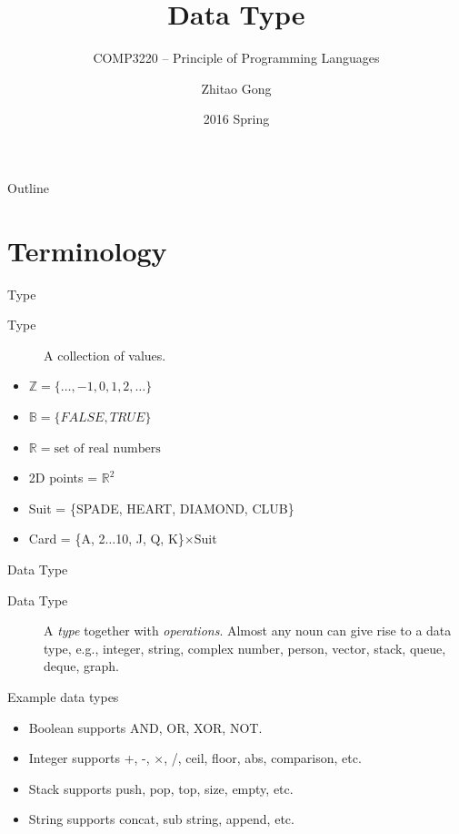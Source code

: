 \documentclass[presentation]{beamer}
\author{Zhitao Gong}
\date{2016 Spring}
\title{Data Type}
\subtitle{COMP3220 -- Principle of Programming Languages}
\begin{document}
\maketitle
\begin{frame}{Outline}
\setcounter{tocdepth}{2}
\tableofcontents
\end{frame}


\section{Terminology}
\label{sec:orgheadline4}

\begin{frame}[label={sec:orgheadline1}]{Type}
\begin{description}
\item[{Type}] A collection of values.
\end{description}


\begin{itemize}
\item \(\mathbb{Z} = \{\dots, -1, 0, 1, 2, \dots\}\)
\item \(\mathbb{B} = \{FALSE, TRUE\}\)
\item \(\mathbb{R} = \text{set of real numbers}\)
\item 2D points = \(\mathbb{R}^2\)
\item Suit = \{SPADE, HEART, DIAMOND, CLUB\}
\item Card = \{A, 2\(\dots\)10, J, Q, K\}\(\times\)Suit
\end{itemize}
\end{frame}

\begin{frame}[label={sec:orgheadline2}]{Data Type}
\begin{description}
\item[{Data Type}] A \emph{type} together with \emph{operations}.  Almost any
noun can give rise to a data type, e.g., integer, string,
complex number, person, vector, stack, queue, deque, graph.
\end{description}


Example data types

\begin{itemize}
\item Boolean supports AND, OR, XOR, NOT.
\item Integer supports +, -, \(\times\), /, ceil, floor, abs,
comparison, etc.
\item Stack supports push, pop, top, size, empty, etc.
\item String supports concat, sub string, append, etc.
\end{itemize}
\end{frame}
\end{document}
